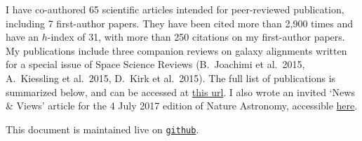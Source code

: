 I have co-authored 65 scientific articles intended for peer-reviewed publication,
including 7 first-author papers. They have been cited more than 2,900 times and
have an $h$-index of 31, with more than 250 citations on my first-author papers.
My publications include three companion reviews on galaxy alignments written for a
special issue of Space Science Reviews (B.\ Joachimi et al.\ 2015, A.\ Kiessling
et al.\ 2015, D.\ Kirk et al.\ 2015). The full list of publications is summarized
below, and can be accessed at \href{https://goo.gl/LAu9G4}{this url}. I also wrote
an invited `News \& Views' article for the 4 July 2017 edition of Nature
Astronomy, accessible
\href{https://www.nature.com/articles/s41550-017-0181}{here}.

This document is maintained live on
\href{https://github.com/cristobal-sifon/cv/blob/master/Sifon_publications.pdf}{\texttt{github}}.

